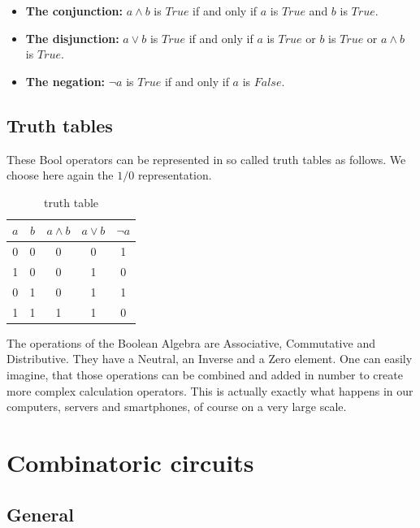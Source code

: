 \documentclass[10pt,a4paper]{article}
\begin{document}
\begin{itemize}
 \item \textbf{The conjunction:} $a\land b$ is $True$ if and only if $a$ is $True$ and $b$ is $True$.\\
 \item \textbf{The disjunction:} $a\lor b$  is $True$ if and only if $a$ is $True$ or $b$ is $True$ or $a\wedge b$ is $True$.\\
 \item \textbf{The negation:}  $\neg a$ is $True$ if and only if $a$ is $False$. 
\end{itemize}

\subsection{Truth tables}
These Bool operators can be represented in so called truth tables as follows. We choose here again the $1 / 0$ representation.

\begin{table}[H]
\centering
\begin{tabular}{c|c|c|c|c}
\textbf{$a$} & \textbf{$b$} & \textbf{$a\land b$} & \textbf{$a\lor b$} & \textbf{$\neg a$} \\ \hline
0          & 0          & 0            & 0            & 1           \\
1          & 0          & 0            & 1            & 0           \\
0          & 1          & 0            & 1            & 1           \\
1          & 1          & 1            & 1            & 0          
\end{tabular}
\caption{truth table}
\label{tab:truth}
\end{table}

The operations of the Boolean Algebra are Associative, Commutative and Distributive. They have a Neutral, an Inverse and a Zero element. One can easily imagine, that those operations can be combined and added in number to create more complex calculation operators. This is actually exactly what happens in our computers, servers and smartphones, of course on a very large scale. 

\section{Combinatoric circuits}
\subsection{General}
\end{document}
